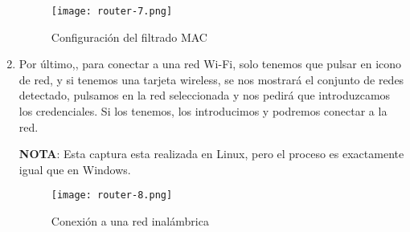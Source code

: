 \begin{enumerate}
    \begin{figure}[H]
        \centering
        \texttt{[image: router-7.png]}
        \caption{Configuración del filtrado MAC}
    \end{figure}

    \item Por último,, para conectar a una red Wi-Fi, solo tenemos que pulsar en icono de red, y si tenemos una tarjeta wireless, se nos mostrará el conjunto de redes detectado, pulsamos en la red seleccionada y nos pedirá que introduzcamos los credenciales. Si los tenemos, los introducimos y podremos conectar a la red.

    \textbf{NOTA}: Esta captura esta realizada en Linux, pero el proceso es exactamente igual que en Windows.

   \begin{figure}[H]
        \centering
        \texttt{[image: router-8.png]}
        \caption{Conexión a una red inalámbrica}
    \end{figure}
\end{enumerate}







%
%

